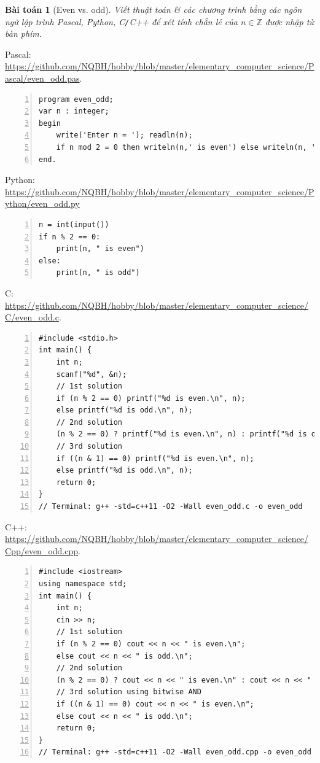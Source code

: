 \documentclass{article}
\newtheorem{baitoan}{Bài toán}
\begin{document}
\begin{baitoan}[Even vs. odd]
	Viết thuật toán \& các chương trình bằng các ngôn ngữ lập trình {\sf Pascal, Python, C{\tt /}C++} để xét tính chẵn lẻ của $n\in\mathbb{Z}$ được nhập từ bàn phím.
\end{baitoan}
\noindent Pascal: \url{https://github.com/NQBH/hobby/blob/master/elementary_computer_science/Pascal/even_odd.pas}.
\begin{Verbatim}[numbers=left,xleftmargin=5mm]
program even_odd;
var n : integer;
begin
    write('Enter n = '); readln(n);
    if n mod 2 = 0 then writeln(n,' is even') else writeln(n, ' is odd');
end.
\end{Verbatim}
Python: \url{https://github.com/NQBH/hobby/blob/master/elementary_computer_science/Python/even_odd.py}
\begin{Verbatim}[numbers=left,xleftmargin=5mm]
n = int(input())
if n % 2 == 0:
    print(n, " is even")
else:
    print(n, " is odd")
\end{Verbatim}
C: \url{https://github.com/NQBH/hobby/blob/master/elementary_computer_science/C/even_odd.c}.
\begin{Verbatim}[numbers=left,xleftmargin=5mm]
#include <stdio.h>
int main() {
    int n;
    scanf("%d", &n);
    // 1st solution
    if (n % 2 == 0) printf("%d is even.\n", n);
    else printf("%d is odd.\n", n);
    // 2nd solution
    (n % 2 == 0) ? printf("%d is even.\n", n) : printf("%d is odd.\n", n);
    // 3rd solution
    if ((n & 1) == 0) printf("%d is even.\n", n);
    else printf("%d is odd.\n", n);
    return 0;
}
// Terminal: g++ -std=c++11 -O2 -Wall even_odd.c -o even_odd
\end{Verbatim}
C++: \url{https://github.com/NQBH/hobby/blob/master/elementary_computer_science/Cpp/even_odd.cpp}.
\begin{Verbatim}[numbers=left,xleftmargin=5mm]
#include <iostream>
using namespace std;
int main() {
    int n;
    cin >> n;
    // 1st solution
    if (n % 2 == 0) cout << n << " is even.\n";
    else cout << n << " is odd.\n";
    // 2nd solution
    (n % 2 == 0) ? cout << n << " is even.\n" : cout << n << " is odd.\n";
    // 3rd solution using bitwise AND
    if ((n & 1) == 0) cout << n << " is even.\n";
    else cout << n << " is odd.\n";
    return 0;
}
// Terminal: g++ -std=c++11 -O2 -Wall even_odd.cpp -o even_odd
\end{Verbatim}
\end{document}
